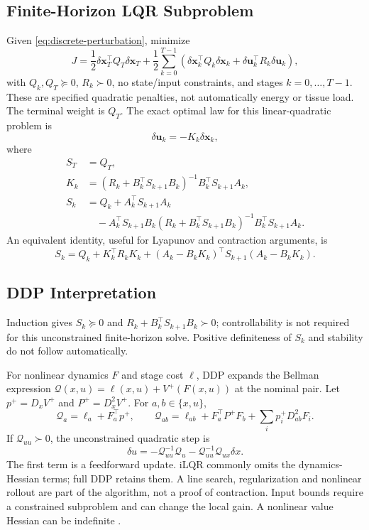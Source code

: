 \documentclass[11pt,letterpaper]{article}
\newcommand{\dx}{\delta\mathbf{x}}
\newcommand{\du}{\delta\mathbf{u}}
\begin{document}
\subsection{Finite-Horizon LQR Subproblem}
Given \eqref{eq:discrete-perturbation}, minimize
\begin{equation}
J = \frac{1}{2}\dx_T^\top Q_T\dx_T
 + \frac{1}{2}\sum_{k=0}^{T-1}
\left(\dx_k^\top Q_k\dx_k + \du_k^\top R_k\du_k\right),
\label{eq:lqr-cost}
\end{equation}
with $Q_k,Q_T\succeq0$, $R_k\succ0$, no state/input constraints, and stages $k=0,\ldots,T-1$. These are specified quadratic penalties, not automatically energy or tissue load. The terminal weight is $Q_T$. The exact optimal law for this linear-quadratic problem is
\begin{equation}
\du_k = -K_k\dx_k,
\label{eq:feedback-law}
\end{equation}
where
\begin{equation}
\begin{aligned}
S_T &= Q_T,\\
K_k &= (R_k + B_k^\top S_{k+1}B_k)^{-1} B_k^\top S_{k+1}A_k,\\
S_k &= Q_k + A_k^\top S_{k+1}A_k \\
&\quad - A_k^\top S_{k+1}B_k(R_k + B_k^\top S_{k+1}B_k)^{-1}B_k^\top S_{k+1}A_k.
\end{aligned}
\label{eq:discrete-riccati}
\end{equation}
An equivalent identity, useful for Lyapunov and contraction arguments, is
\begin{equation}
S_k = Q_k + K_k^\top R_kK_k + (A_k-B_kK_k)^\top S_{k+1}(A_k-B_kK_k).
\label{eq:riccati-equivalent}
\end{equation}

\subsection{DDP Interpretation}
Induction gives $S_k\succeq0$ and $R_k+B_k^\top S_{k+1}B_k\succ0$; controllability is not required for this unconstrained finite-horizon solve. Positive definiteness of $S_k$ and stability do not follow automatically.

For nonlinear dynamics $F$ and stage cost $\ell$, DDP expands the Bellman expression $\mathcal Q(x,u)=\ell(x,u)+V^+(F(x,u))$ at the nominal pair. Let $p^+=D_xV^+$ and $P^+=D_x^2V^+$. For $a,b\in\{x,u\}$,
\[
\mathcal Q_a=\ell_a+F_a^\top p^+,\qquad
\mathcal Q_{ab}=\ell_{ab}+F_a^\top P^+F_b
 +\sum_i p_i^+ D^2_{ab}F_i.
\]
If $\mathcal Q_{uu}\succ0$, the unconstrained quadratic step is
\[
\delta u=-\mathcal Q_{uu}^{-1}\mathcal Q_u
 -\mathcal Q_{uu}^{-1}\mathcal Q_{ux}\delta x.
\]
The first term is a feedforward update. iLQR commonly omits the dynamics-Hessian terms; full DDP retains them. A line search, regularization and nonlinear rollout are part of the algorithm, not a proof of contraction. Input bounds require a constrained subproblem and can change the local gain. A nonlinear value Hessian can be indefinite \citep{tassa2014control}.
\end{document}
